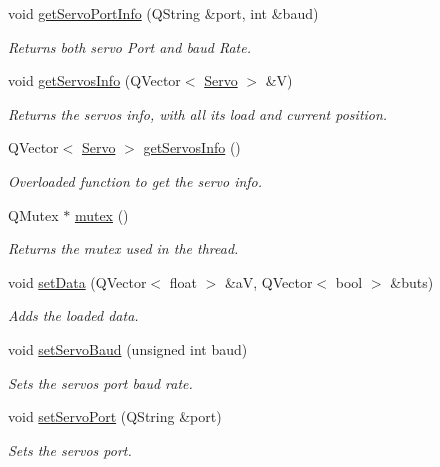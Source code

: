 \begin{DoxyCompactItemize}
void \hyperlink{class_servo_thread_afcf834d93f1ac9663d6ebaab820e5f74}{get\+Servo\+Port\+Info} (Q\+String \&port, int \&baud)
\begin{DoxyCompactList}\small\item\em Returns both servo Port and baud Rate. \end{DoxyCompactList}\item 
void \hyperlink{class_servo_thread_a5fd8ef13314428f5ba7646730cc58f1c}{get\+Servos\+Info} (Q\+Vector$<$ \hyperlink{struct_servo_thread_1_1_servo}{Servo} $>$ \&V)
\begin{DoxyCompactList}\small\item\em Returns the servos info, with all its load and current position. \end{DoxyCompactList}\item 
Q\+Vector$<$ \hyperlink{struct_servo_thread_1_1_servo}{Servo} $>$ \hyperlink{class_servo_thread_a3d58189cdeddfb828856f192607f68d2}{get\+Servos\+Info} ()
\begin{DoxyCompactList}\small\item\em Overloaded function to get the servo info. \end{DoxyCompactList}\item 
Q\+Mutex $\ast$ \hyperlink{class_servo_thread_a82d074ab2c445470a6f49e2935bf6a8e}{mutex} ()
\begin{DoxyCompactList}\small\item\em Returns the mutex used in the thread. \end{DoxyCompactList}\item 
void \hyperlink{class_servo_thread_a8497ea56991b620981ce1fbf53d9ebdb}{set\+Data} (Q\+Vector$<$ float $>$ \&a\+V, Q\+Vector$<$ bool $>$ \&buts)
\begin{DoxyCompactList}\small\item\em Adds the loaded data. \end{DoxyCompactList}\item 
void \hyperlink{class_servo_thread_a009d3d1b99007b14fadb49996fac49d6}{set\+Servo\+Baud} (unsigned int baud)
\begin{DoxyCompactList}\small\item\em Sets the servos port baud rate. \end{DoxyCompactList}\item 
void \hyperlink{class_servo_thread_a144e31105019d833f59ca2eba012e638}{set\+Servo\+Port} (Q\+String \&port)
\begin{DoxyCompactList}\small\item\em Sets the servos port. \end{DoxyCompactList}\item 

\end{DoxyCompactItemize}
